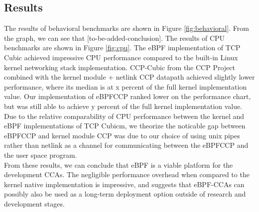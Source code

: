 \documentclass[../main.tex]{subfiles}
\begin{document}
\subsection{Results}
The results of behavioral benchmarks are shown in Figure \ref{fig:behavioral}. From the graph, we can see that [to-be-added-conclusion]. The results of CPU benchmarks are shown in Figure \ref{fig:cpu}. The eBPF implementation of TCP Cubic achieved impressive CPU performance compared to the built-in Linux kernel networking stack implementation. CCP-Cubic from the CCP Project \cite{generic-cong-avoid} combined with the kernel module + netlink CCP datapath achieved slightly lower performance, where its median is at x percent of the full kernel implementation value. Our implementation of eBPFCCP ranked lower on the performance chart, but was still able to achieve y percent of the full kernel implementation value. Due to the relative comparability of CPU performance between the kernel and eBPF implementations of TCP Cubicm, we theorize the noticable gap between eBPFCCP and kernel module CCP was due to our choice of using unix pipes rather than netlink as a channel for communicating between the eBPFCCP and the user space program. \\
From these results, we can conclude that eBPF is a viable platform for the development CCAs. The negligible performance overhead when compared to the kernel native implementation is impressive, and suggests that eBPF-CCAs can possibly also be used as a long-term deployment option outside of research and development stages. 
\end{document}
